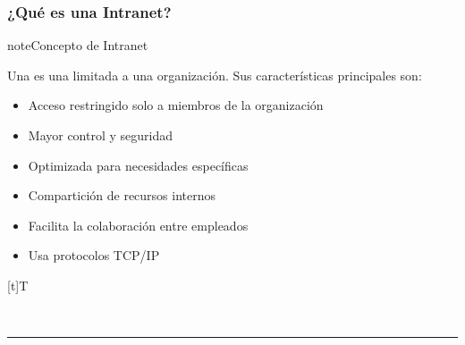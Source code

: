 \documentclass[letterpaper,10pt,spanish]{sphinxmanual}
\let\sphinxpxdimen\pdfpxdimen\else\newdimen\sphinxpxdimen
\begin{document}
\subsubsection{¿Qué es una Intranet?}
\label{\detokenize{1_guias/10informatica/G1003:que-es-una-intranet}}
\begin{sphinxadmonition}{note}{Concepto de Intranet}

\sphinxAtStartPar
Una  es una  limitada a una organización. Sus características principales son:
\begin{itemize}
\item {} 
\sphinxAtStartPar
Acceso restringido solo a miembros de la organización

\item {} 
\sphinxAtStartPar
Mayor control y seguridad

\item {} 
\sphinxAtStartPar
Optimizada para necesidades específicas

\item {} 
\sphinxAtStartPar
Compartición de recursos internos

\item {} 
\sphinxAtStartPar
Facilita la colaboración entre empleados

\item {} 
\sphinxAtStartPar
Usa protocolos TCP/IP

\end{itemize}


\begin{savenotes}\sphinxattablestart
\sphinxthistablewithglobalstyle
\centering
\begin{tabulary}{\linewidth}[t]{T}
\sphinxtoprule
\sphinxtableatstartofbodyhook

\begin{sphinxfigure-in-table}
\centering
\capstart
\noindent\sphinxincludegraphics[width=360\sphinxpxdimen]{{image021}.png}
\label{\detokenize{1_guias/10informatica/G1003:id2}}\end{sphinxfigure-in-table}\relax
\\
\sphinxbottomrule
\end{tabulary}
\sphinxtableafterendhook\par
\sphinxattableend\end{savenotes}
\end{sphinxadmonition}


\bigskip\hrule\bigskip
\end{document}
